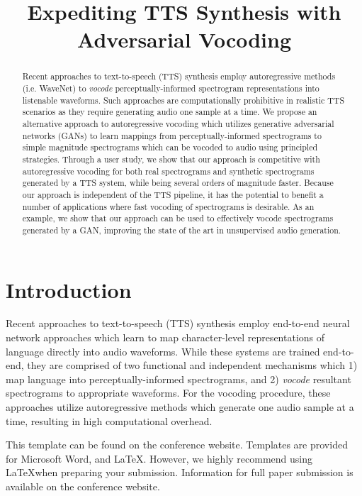 \documentclass[a4paper]{article}
\title{Expediting TTS Synthesis with Adversarial Vocoding}
\begin{document}
\maketitle
% 
\begin{abstract}
Recent approaches to text-to-speech (TTS) synthesis employ autoregressive methods (i.e. WaveNet) to \emph{vocode} perceptually-informed spectrogram representations into listenable waveforms. 
Such approaches are computationally prohibitive in realistic TTS scenarios as they require generating audio one sample at a time. 
We propose an alternative approach to autoregressive vocoding which utilizes generative adversarial networks (GANs) to learn mappings from perceptually-informed spectrograms to simple magnitude spectrograms which can be vocoded to audio using principled strategies. 
Through a user study, we show that our approach is competitive with autoregressive vocoding for both real spectrograms and synthetic spectrograms generated by a TTS system, while being several orders of magnitude faster. 
Because our approach is independent of the TTS pipeline, it has the potential to benefit a number of applications where fast vocoding of spectrograms is desirable. 
As an example, we show that our approach can be used to effectively vocode spectrograms generated by a GAN, improving the state of the art in unsupervised audio generation.
\end{abstract}


\section{Introduction}

Recent approaches to text-to-speech (TTS) synthesis employ end-to-end neural network approaches which learn to map character-level representations of language directly into audio waveforms. 
While these systems are trained end-to-end, they are comprised of two functional and independent mechanisms which 
1) map language into perceptually-informed spectrograms, and 
2) \emph{vocode} resultant spectrograms to appropriate waveforms. 
For the vocoding procedure, these approaches utilize autoregressive methods which generate one audio sample at a time, resulting in high computational overhead. 

This template can be found on the conference website. Templates are provided for Microsoft Word\textregistered, and \LaTeX. However, we highly recommend using \LaTeX when preparing your submission. Information for full paper submission is available on the conference website.
\end{document}
